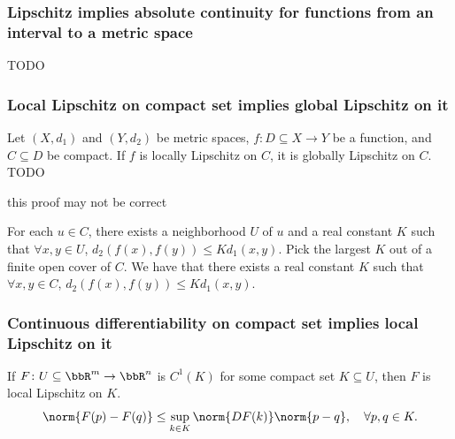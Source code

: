 \documentclass[a4paper,12pt]{report}
\begin{document}
\begin{itemize}
\begin{itemize}
\subsubsection{Lipschitz implies absolute continuity for functions from an interval to a metric space}
TODO
\subsubsection{Local Lipschitz on compact set implies global Lipschitz on it}
Let $(X,d_1)$ and $(Y,d_2)$ be metric spaces, $f\colon D\subseteq X\to Y$ be a function, and $C\subseteq D$ be compact. If $f$ is locally Lipschitz on $C$, it is globally Lipschitz on $C$.
\bpr
TODO

this proof may not be correct

For each $u\in C$, there exists a neighborhood $U$ of $u$ and a real constant $K$ such that $\forall x,y\in U$, $d_{2}(f(x),f(y))\leq Kd_{1}(x,y)$. Pick the largest $K$ out of a finite open cover of $C$. We have that there exists a real constant $K$ such that $\forall x,y\in C$, $d_{2}(f(x),f(y))\leq Kd_{1}(x,y)$.
\epr
\subsubsection{Continuous differentiability on compact set implies local Lipschitz on it}
If $F\colon U\subseteq\bbR^m\to\bbR^n$ is $C^1(K)$ for some compact set $K\subseteq U$, then $F$ is local Lipschitz on $K$.
\bpr
\[\norm{F(p)-F(q)}\le\sup_{k\in K}\norm{DF(k)}\norm{p-q},\quad\forall p,q \in K.\]
\epr

\end{itemize}
\end{itemize}
\end{document}
